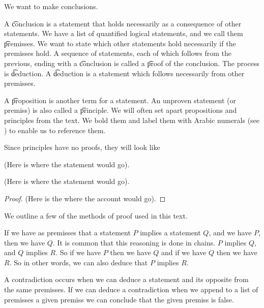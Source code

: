 

We want to make conclusions.


A \t{conclusion} is a statement that holds necessarily as a consequence of other statements.
We have a list of quantified logical statements, and we call them \t{premisses}.
We want to state which other statements hold necessarily if the premisses hold.
A sequence of statements, each of which follows from the previous, ending with a \t{conclusion} is called a \t{proof} of the conclusion.
The process is \t{deduction}.
A \t{deduction} is a statement which follows necessarily from other premisses.

A \t{proposition} is another term for a statement.
An unproven statement (or premiss) is also called a \t{principle}.
We will often set apart propositions and principles from the text.
We bold them and label them with Arabic numerals (see ) to enable us to reference them.


Since principles have no proofs, they will look like
\begin{principle}
  (Here is where the statement would go).
\end{principle}

\begin{proposition}
  (Here is where the statement would go).
  \begin{proof}
    (Here is the where the account would go).
  \end{proof}
\end{proposition}


We outline a few of the methods of proof used in this text.


If we have as premisses that a statement $P$ implies a statement $Q$, and we have $P$, then we have $Q$.
It is common that this reasoning is done in chains.
$P$ implies $Q$, and $Q$ implies $R$. So if we have $P$ then we have $Q$ and if we have $Q$ then we have $R$.
So in other words, we can also deduce that $P$ implies $R$.


A contradiction occurs when we can deduce a statement and its opposite from the same premisses.
If we can deduce a contradiction when we append to a list of premisses a given premiss we can conclude that the given premiss is false.

